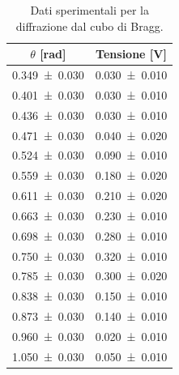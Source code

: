 \documentclass[a4paper]{article}
\begin{document}
\begin{table}[htbp]
\centering
\caption{Dati sperimentali per la diffrazione dal cubo di Bragg.}
\label{tab:dati_bragg}
\begin{tabular}{|c|c|}
\hline
$\theta$ [\si{\radian}] & Tensione [\si{\volt}] \\\hline\hline
\num{0.349 \pm 0.030} & \num{0.030 \pm 0.010} \\ %
\num{0.401 \pm 0.030} & \num{0.030 \pm 0.010} \\ %
\num{0.436 \pm 0.030} & \num{0.030 \pm 0.010} \\ %
\num{0.471 \pm 0.030} & \num{0.040 \pm 0.020} \\ %
\num{0.524 \pm 0.030} & \num{0.090 \pm 0.010} \\ %
\num{0.559 \pm 0.030} & \num{0.180 \pm 0.020} \\ %
\num{0.611 \pm 0.030} & \num{0.210 \pm 0.020} \\ %
\num{0.663 \pm 0.030} & \num{0.230 \pm 0.010} \\ %
\num{0.698 \pm 0.030} & \num{0.280 \pm 0.010} \\ %
\num{0.750 \pm 0.030} & \num{0.320 \pm 0.010} \\ %
\num{0.785 \pm 0.030} & \num{0.300 \pm 0.020} \\ %
\num{0.838 \pm 0.030} & \num{0.150 \pm 0.010} \\ %
\num{0.873 \pm 0.030} & \num{0.140 \pm 0.010} \\ %
\num{0.960 \pm 0.030} & \num{0.020 \pm 0.010} \\ %
\num{1.050 \pm 0.030} & \num{0.050 \pm 0.010} \\ %
\hline
\end{tabular}
\end{table}
\end{document}

